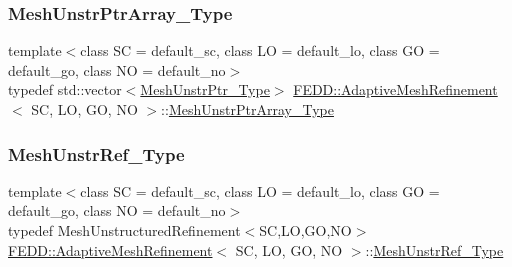 \mbox{\label{classFEDD_1_1AdaptiveMeshRefinement_aae5b66cd506467dbeff01795c41cafcb}} 
\subsubsection{\texorpdfstring{Mesh\+Unstr\+Ptr\+Array\+\_\+\+Type}{MeshUnstrPtrArray\_Type}}
{\footnotesize\ttfamily template$<$class SC  = default\+\_\+sc, class LO  = default\+\_\+lo, class GO  = default\+\_\+go, class NO  = default\+\_\+no$>$ \\
typedef std\+::vector$<$\hyperlink{classFEDD_1_1AdaptiveMeshRefinement_abc927c0c0253b094c3c53338f9128d20}{Mesh\+Unstr\+Ptr\+\_\+\+Type}$>$ \hyperlink{classFEDD_1_1AdaptiveMeshRefinement}{F\+E\+D\+D\+::\+Adaptive\+Mesh\+Refinement}$<$ SC, LO, GO, NO $>$\+::\hyperlink{classFEDD_1_1AdaptiveMeshRefinement_aae5b66cd506467dbeff01795c41cafcb}{Mesh\+Unstr\+Ptr\+Array\+\_\+\+Type}}

\mbox{\label{classFEDD_1_1AdaptiveMeshRefinement_ade0625d6a1aa9c3586f3b04abb0a9e5e}} 
\subsubsection{\texorpdfstring{Mesh\+Unstr\+Ref\+\_\+\+Type}{MeshUnstrRef\_Type}}
{\footnotesize\ttfamily template$<$class SC  = default\+\_\+sc, class LO  = default\+\_\+lo, class GO  = default\+\_\+go, class NO  = default\+\_\+no$>$ \\
typedef Mesh\+Unstructured\+Refinement$<$SC,LO,GO,NO$>$ \hyperlink{classFEDD_1_1AdaptiveMeshRefinement}{F\+E\+D\+D\+::\+Adaptive\+Mesh\+Refinement}$<$ SC, LO, GO, NO $>$\+::\hyperlink{classFEDD_1_1AdaptiveMeshRefinement_ade0625d6a1aa9c3586f3b04abb0a9e5e}{Mesh\+Unstr\+Ref\+\_\+\+Type}}

